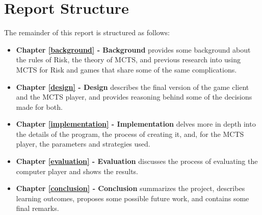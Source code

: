 \section{Report Structure}
\label{reportStructure}

The remainder of this report is structured as follows:
\begin{itemize}
\item \textbf{Chapter \ref{background} - Background} provides some background about the rules of Risk, the theory of MCTS, and previous research into using MCTS for Risk and games that share some of the same complications.
\item \textbf{Chapter \ref{design} - Design} describes the final version of the game client and the MCTS player, and provides reasoning behind some of the decisions made for both.
\item \textbf{Chapter \ref{implementation} - Implementation} delves more in depth into the details of the program, the process of creating it, and, for the MCTS player, the parameters and strategies used.
\item \textbf{Chapter \ref{evaluation} - Evaluation} discusses the process of evaluating the computer player and shows the results.
\item \textbf{Chapter \ref{conclusion} - Conclusion} summarizes the project, describes learning outcomes, proposes some possible future work, and contains some final remarks.
\end{itemize}